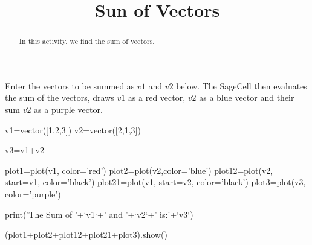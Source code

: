 \documentclass{ximera}
\title{Sun of Vectors}
\begin{document}
      
\begin{abstract}
      
In this activity, we find the sum of vectors.
      
\end{abstract}
      
\maketitle
      
Enter the vectors to be summed as $v1$ and $v2$ below.  The SageCell then evaluates the sum of the vectors, draws $v1$ as a red vector, $v2$ as a blue vector and  their sum $v2$ as a purple vector.

\begin{sageCell}
v1=vector([1,2,3])
v2=vector([2,1,3])

v3=v1+v2

plot1=plot(v1, color='red')
plot2=plot(v2,color='blue')
plot12=plot(v2, start=v1, color='black')
plot21=plot(v1, start=v2, color='black')
plot3=plot(v3, color='purple')

print('The Sum of '+`v1`+' and '+`v2`+' is:'+`v3`)

(plot1+plot2+plot12+plot21+plot3).show()
\end{sageCell}





 
 
 
 
      
\end{document}
